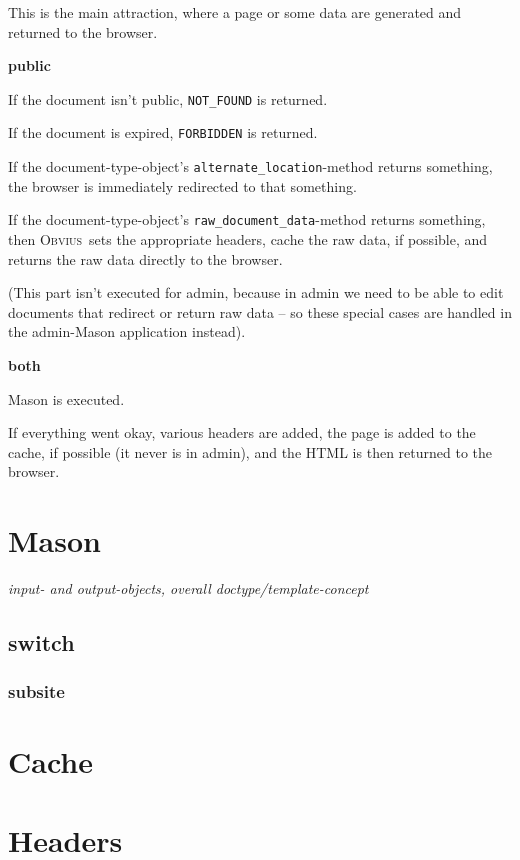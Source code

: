 \documentclass[a4paper,12pt]{article}
\newcommand{\obvius}{\textsc{Obvius}}
\newcommand{\notfound}{\texttt{NOT\_FOUND}}
\newcommand{\forbidden}{\texttt{FORBIDDEN}}
\begin{document}
This is the main attraction, where a page or some data are generated
and returned to the browser.

\textbf{public}

If the document isn't public, {\notfound} is returned.

If the document is expired, {\forbidden} is returned.

If the document-type-object's \texttt{alternate\_location}-method
returns something, the browser is immediately redirected to that
something.

If the document-type-object's \texttt{raw\_document\_data}-method
returns something, then \obvius\ sets the appropriate headers, cache
the raw data, if possible, and returns the raw data directly to the
browser.

(This part isn't executed for admin, because in admin we need to be
able to edit documents that redirect or return raw data -- so these
special cases are handled in the admin-Mason application instead).

\textbf{both}

Mason is executed.

If everything went okay, various headers are added, the page is added
to the cache, if possible (it never is in admin), and the HTML is then
returned to the browser.


\section{Mason}

\emph{input- and output-objects, overall doctype/template-concept}

\subsection{switch}

\subsubsection{subsite}


\section{Cache}


\section{Headers}
\end{document}
